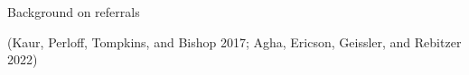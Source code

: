 \documentclass[slides, aspectratio=169]{beamer}
\begin{document}
\begin{frame}[t]{Background on referrals}
\begin{itemize}
{\parbox{\linewidth}{\footnotesize
(Kaur, Perloff, Tompkins, and Bishop 2017; 
Agha, Ericson, Geissler, and Rebitzer 2022) 
}

}

\end{itemize}
\end{frame}

\end{document}
